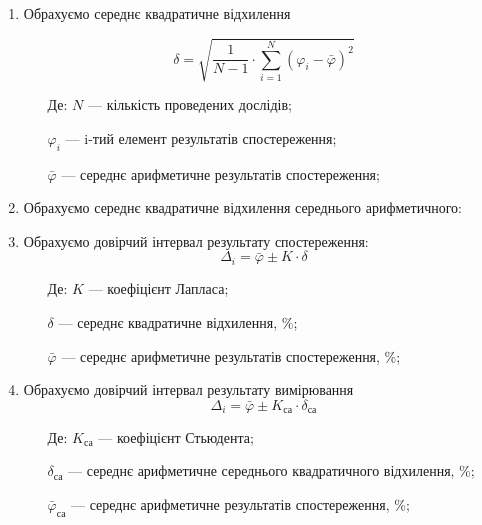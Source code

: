 \begin{enumerate}[leftmargin=*]
\item Обрахуємо середнє квадратичне відхилення

  \begin{equation}
    \delta = \sqrt{\frac{1}{N-1} \cdot \displaystyle\sum_{i=1}^{N} ({\varphi_i} -\bar{\varphi})^2}
  \end{equation}
  
  \begin{itemize}
  \item [Де:] $N$ --- кількість проведених дослідів;
  \item []$\varphi_i$ ---  i-тий елемент результатів спостереження;
  \item []$\bar{\varphi}$ ---  середнє арифметичне результатів спостереження;
  \end{itemize}

  
  
\item Обрахуємо середнє квадратичне відхилення середнього арифметичного:
  

\item Обрахуємо довірчий інтервал результату спостереження:
  \begin{equation}
    \Delta_i = \bar{\varphi} \pm K \cdot \delta
  \end{equation}

  \begin{itemize}
  \item [Де:] $K$ --- коефіцієнт Лапласа;
  \item []$\delta$ ---  середнє квадратичне відхилення, \%;
  \item []$\bar{\varphi}$ ---  середнє арифметичне результатів спостереження, \%;
  \end{itemize}
  

\item Обрахуємо довірчий інтервал результату вимірювання
  \begin{equation}
    \Delta_i = \bar{\varphi} \pm K_{\text{са}} \cdot \delta_{\text{са}}
  \end{equation}

  \begin{itemize}
  \item [Де:] $K_{\text{са}}$ --- коефіцієнт Стьюдента;
  \item []$\delta_{\text{са}}$ ---  середнє арифметичне середнього квадратичного відхилення, \%;
  \item []$\bar{\varphi}_{\text{са}}$ ---  середнє арифметичне результатів спостереження, \%;
  \end{itemize}
  
\end{enumerate}

